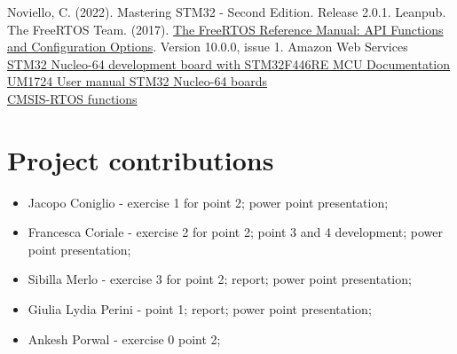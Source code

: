 \documentclass[a4paper,11pt]{report}
\begin{document}
Noviello, C. (2022). Mastering STM32 - Second Edition. Release 2.0.1. Leanpub. \\

The FreeRTOS Team. (2017). \href{https://www.freertos.org/fr-content-src/uploads/2018/07/FreeRTOS_Reference_Manual_V10.0.0.pdf}{The FreeRTOS\texttrademark{} Reference Manual: API Functions and Configuration Options}. Version 10.0.0, issue 1. Amazon Web Services \\

\href{https://www.st.com/en/evaluation-tools/nucleo-f446re.html#documentation}{STM32 Nucleo-64 development board with STM32F446RE MCU Documentation}\\

\href{https://www.st.com/resource/en/user_manual/um1724-stm32-nucleo64-boards-mb1136-stmicroelectronics.pdf}{UM1724 User manual STM32 Nucleo-64 boards}\\

\href{https://www.keil.com/pack/doc/CMSIS/RTOS/html/functionOverview.html}{CMSIS-RTOS functions}\\


\section{Project contributions}

\begin{itemize}
    \item Jacopo Coniglio - exercise 1 for point 2; power point presentation;
    \item Francesca Coriale - exercise 2 for point 2; point 3 and 4 development; power point presentation;
    \item Sibilla Merlo - exercise 3 for point 2; report; power point presentation;
    \item Giulia Lydia Perini - point 1; report; power point presentation;
    \item Ankesh Porwal - exercise 0 point 2;
\end{itemize}
\end{document}
